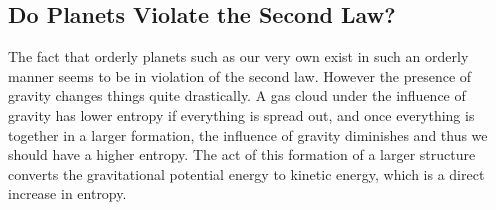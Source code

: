 \documentclass[12pt]{article}
\begin{document}
\subsection{Do Planets Violate the Second Law?}
The fact that orderly planets such as our very own exist in such an orderly manner seems to be in violation of the second law. However the presence of gravity changes things quite drastically. A gas cloud under the influence of gravity has lower entropy if everything is spread out, and once everything is together in a larger formation, the influence of gravity diminishes and thus we should have a higher entropy. The act of this formation of a larger structure converts the gravitational potential energy to kinetic energy, which is a direct increase in entropy. 
\end{document}
